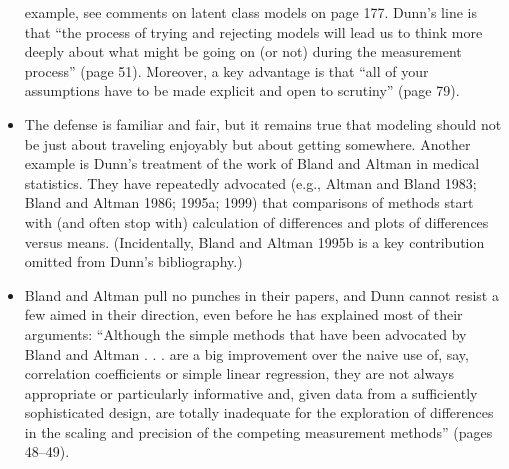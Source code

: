 \begin{itemize}
example, see comments on latent class models on page 177. Dunn’s line is that “the
process of trying and rejecting models will lead us to think more deeply about what
might be going on (or not) during the measurement process” (page 51). Moreover, a
key advantage is that “all of your assumptions have to be made explicit and open to
scrutiny” (page 79). 
\item The defense is familiar and fair, but it remains true that modeling
should not be just about traveling enjoyably but about getting somewhere.
Another example is Dunn’s treatment of the work of Bland and Altman in medical
statistics. They have repeatedly advocated (e.g., Altman and Bland 1983; Bland
and Altman 1986; 1995a; 1999) that comparisons of methods start with (and often
stop with) calculation of differences and plots of differences versus means. (Incidentally,
Bland and Altman 1995b is a key contribution omitted from Dunn’s bibliography.)

\item Bland and Altman pull no punches in their papers, and Dunn cannot resist a
few aimed in their direction, even before he has explained most of their arguments:
“Although the simple methods that have been advocated by Bland and Altman . . . are
a big improvement over the naive use of, say, correlation coefficients or simple linear
regression, they are not always appropriate or particularly informative and, given data
from a sufficiently sophisticated design, are totally inadequate for the exploration of
differences in the scaling and precision of the competing measurement methods” (pages
48–49).

\end{itemize}

\newpage



